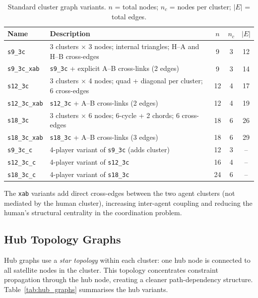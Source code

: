 \documentclass[11pt]{article}
\theoremstyle{definition}
\begin{document}
\begin{table}[h]
\centering
\caption{Standard cluster graph variants.  $n$ = total nodes;
         $n_c$ = nodes per cluster; $|E|$ = total edges.}
\label{tab:standard_graphs}
\begin{tabular}{llccc}
\toprule
\textbf{Name} & \textbf{Description} & $n$ & $n_c$ & $|E|$ \\
\midrule
\texttt{s9\_3c}      & 3 clusters $\times$ 3 nodes; internal triangles; H--A and H--B cross-edges  & 9  & 3 & 12 \\
\texttt{s9\_3c\_xab} & \texttt{s9\_3c} + explicit A--B cross-links (2 edges)                      & 9  & 3 & 14 \\
\texttt{s12\_3c}     & 3 clusters $\times$ 4 nodes; quad + diagonal per cluster; 6 cross-edges   & 12 & 4 & 17 \\
\texttt{s12\_3c\_xab}& \texttt{s12\_3c} + A--B cross-links (2 edges)                             & 12 & 4 & 19 \\
\texttt{s18\_3c}     & 3 clusters $\times$ 6 nodes; 6-cycle + 2 chords; 6 cross-edges            & 18 & 6 & 26 \\
\texttt{s18\_3c\_xab}& \texttt{s18\_3c} + A--B cross-links (3 edges)                             & 18 & 6 & 29 \\
\midrule
\texttt{s9\_3c\_c}   & 4-player variant of \texttt{s9\_3c} (adds \AgentC{} cluster)              & 12 & 3 & -- \\
\texttt{s12\_3c\_c}  & 4-player variant of \texttt{s12\_3c}                                       & 16 & 4 & -- \\
\texttt{s18\_3c\_c}  & 4-player variant of \texttt{s18\_3c}                                       & 24 & 6 & -- \\
\bottomrule
\end{tabular}
\end{table}

The \texttt{xab} variants add direct cross-edges between the two agent clusters (not
mediated by the human cluster), increasing inter-agent coupling and reducing the human's
structural centrality in the coordination problem.

\subsection{Hub Topology Graphs}

Hub graphs use a \emph{star topology} within each cluster: one hub node is connected to
all satellite nodes in the cluster.  This topology concentrates constraint propagation
through the hub node, creating a cleaner path-dependency structure.  Table~\ref{tab:hub_graphs}
summarises the hub variants.
\end{document}

